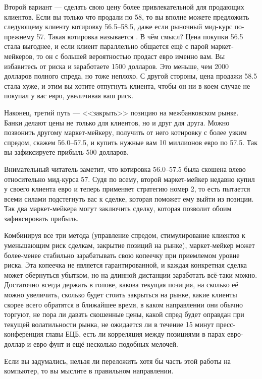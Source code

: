 Второй вариант --- сделать свою цену более привлекательной для продающих
клиентов. Если вы только что продали по 58, то вы вполне можете предложить
следующему клиенту котировку \num{56.5}--\num{58.5}, даже если рыночный мид-курс
по-прежнему \num{57}. Такая котировка называется . В чём
смысл? Цена покупки \num{56.5} стала выгоднее, и если клиент параллельно
общается ещё с парой маркет-мейкеров, то он с большей вероятностью продаст евро
именно вам. Вы избавитесь от риска и заработаете \num{1500} долларов. Это
меньше, чем \num{2000} долларов полного спреда, но тоже неплохо. С другой
стороны, цена продажи \num{58.5} стала хуже, и этим вы хотите отпугнуть клиента,
чтобы он ни в коем случае не покупал у вас евро, увеличивая ваш риск.

Наконец, третий путь --- <<закрыть>> позицию на межбанковском рынке. Банки
делают цены не только для клиентов, но и друг для друга. Можно позвонить другому
маркет-мейкеру, получить от него котировку с более узким спредом, скажем
\num{56.0}--\num{57.5}, и купить нужные вам 10 миллионов евро по \num{57.5}. Так
вы зафиксируете прибыль \num{500} долларов.

Внимательный читатель заметит, что котировка \num{56.0}--\num{57.5} была скошена
влево относительно мид-курса 57. Судя по всему, второй маркет-мейкер недавно
купил у своего клиента евро и теперь применяет стратегию номер 2, то есть
пытается всеми силами подстегнуть вас к сделке, которая поможет ему выйти из
позиции. Так два маркет-мейкера могут заключить сделку, которая позволит обоим
зафиксировать прибыль.

Комбинируя все три метода (управление спредом, стимулирование клиентов к
уменьшающим риск сделкам, закрытие позиций на рынке), маркет-мейкер может
более-менее стабильно зарабатывать свою копеечку при приемлемом уровне риска.
Эта копеечка не является гарантированной, и каждая конкретная сделка может
обернуться убытком, но на длинной дистанции заработать всё-таки можно.
Достаточно всегда держать в голове, какова текущая позиция, на сколько её можно
увеличить, сколько будет стоить закрыться на рынке, какие клиенты скорее всего
обратятся в ближайшее время, в каком направлении они обычно торгуют, не пора ли
давать скошенные цены, какой спред будет оправдан при текущей волатильности
рынка, не ожидается ли в течение 15 минут пресс-конференция главы ЕЦБ, есть ли
корреляция между позициями в парах евро-доллар и евро-фунт и ещё несколько
подобных мелочей.

Если вы задумались, нельзя ли переложить хотя бы часть этой работы на компьютер,
то вы мыслите в правильном направлении.

